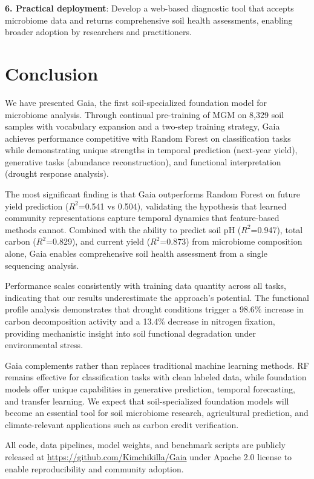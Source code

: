 \documentclass[11pt,a4paper]{article}
\begin{document}
\textbf{6. Practical deployment}: Develop a web-based diagnostic tool that accepts microbiome data and returns comprehensive soil health assessments, enabling broader adoption by researchers and practitioners.

\section{Conclusion}

We have presented Gaia, the first soil-specialized foundation model for microbiome analysis. Through continual pre-training of MGM on 8,329 soil samples with vocabulary expansion and a two-step training strategy, Gaia achieves performance competitive with Random Forest on classification tasks while demonstrating unique strengths in temporal prediction (next-year yield), generative tasks (abundance reconstruction), and functional interpretation (drought response analysis).

The most significant finding is that Gaia outperforms Random Forest on future yield prediction ($R^2$=0.541 vs 0.504), validating the hypothesis that learned community representations capture temporal dynamics that feature-based methods cannot. Combined with the ability to predict soil pH ($R^2$=0.947), total carbon ($R^2$=0.829), and current yield ($R^2$=0.873) from microbiome composition alone, Gaia enables comprehensive soil health assessment from a single sequencing analysis.

Performance scales consistently with training data quantity across all tasks, indicating that our results underestimate the approach's potential. The functional profile analysis demonstrates that drought conditions trigger a 98.6\% increase in carbon decomposition activity and a 13.4\% decrease in nitrogen fixation, providing mechanistic insight into soil functional degradation under environmental stress.

Gaia complements rather than replaces traditional machine learning methods. RF remains effective for classification tasks with clean labeled data, while foundation models offer unique capabilities in generative prediction, temporal forecasting, and transfer learning. We expect that soil-specialized foundation models will become an essential tool for soil microbiome research, agricultural prediction, and climate-relevant applications such as carbon credit verification.

All code, data pipelines, model weights, and benchmark scripts are publicly released at \url{https://github.com/Kimchikilla/Gaia} under Apache 2.0 license to enable reproducibility and community adoption.
\end{document}
